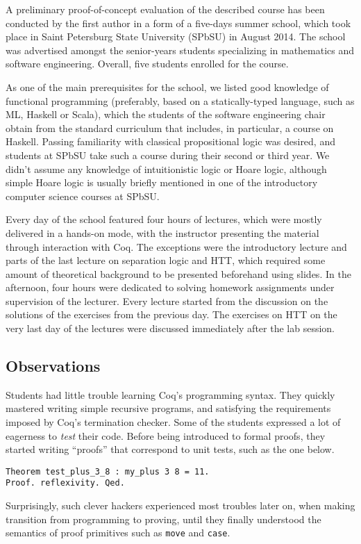 \documentclass[blockstyle,preprint]{sigplanconf}
\newcommand{\code}[1]{\lstinline{#1}}
\begin{document}
A preliminary proof-of-concept evaluation of the described course has
been conducted by the first author in a form of a five-days summer
school, which took place in Saint Petersburg State University (SPbSU)
in August 2014. The school was advertised amongst the senior-years
students specializing in mathematics and software
engineering. Overall, five students enrolled for the course.

As one of the main prerequisites for the school, we listed good
knowledge of functional programming (preferably, based on a
statically-typed language, such as ML, Haskell or Scala), which
the students of the software engineering chair obtain from the
standard curriculum that includes, in particular, a course on Haskell.
%
Passing familiarity with classical propositional logic was desired,
and students at SPbSU take such a course during their second or third
year. We didn't assume any knowledge of intuitionistic logic or Hoare
logic, although simple Hoare logic is usually briefly mentioned in one
of the introductory computer science courses at SPbSU.

Every day of the school featured four hours of lectures, which were
mostly delivered in a hands-on mode, with the instructor presenting
the material through interaction with Coq. The exceptions were the
introductory lecture and parts of the last lecture on separation logic
and HTT, which required some amount of theoretical background to be
presented beforehand using slides. In the afternoon, four hours were
dedicated to solving homework assignments under supervision of the
lecturer. Every lecture started from the discussion on the solutions
of the exercises from the previous day. The exercises on HTT on the
very last day of the lectures were discussed immediately after the lab
session.

\subsection{Observations}
\label{sec:common-observations}
Students had little trouble learning Coq's programming syntax. They
quickly mastered writing simple recursive programs, and satisfying the
requirements imposed by Coq's termination checker. Some of the
students expressed a lot of eagerness to \emph{test} their code.
Before being introduced to formal proofs, they started writing
``proofs'' that correspond to unit tests, such as the one below.
%
\begin{lstlisting}
Theorem test_plus_3_8 : my_plus 3 8 = 11.
Proof. reflexivity. Qed.
\end{lstlisting}
%
Surprisingly, such clever hackers experienced most troubles later on,
when making transition from programming to proving, until they finally
understood the semantics of proof primitives such as \code{move} and
\code{case}.
\end{document}
